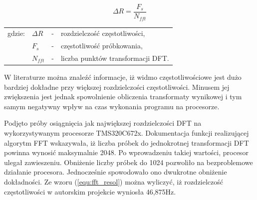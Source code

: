 \begin{equation} \label{equ:fft_resol}
\Delta R = \frac{F_{s}}{N_{fft}}
\end{equation}
\begin{tabular}{ l l l l}
	gdzie: 	&	$\Delta R$ & - &  rozdzielczość częstotliwości, \\
	&	$F_{s}$ & - &  częstotliwość próbkowania, \\
	&   $N_{fft}$ &  - & liczba punktów transformacji DFT. \\
\end{tabular}

W literaturze można znaleźć informacje, iż widmo częstotliwościowe jest dużo bardziej dokładne przy większej rozdzielczości częstotliwości. Minusem jej zwiększenia jest jednak spowolnienie obliczenia transformaty wynikowej i tym samym negatywny wpływ na czas wykonania programu na procesorze.

Podjęto próby osiągnięcia jak największej rozdzielczości DFT na wykorzystywanym procesorze TMS320C672x. Dokumentacja funkcji realizującej algorytm FFT wskazywała, iż liczba próbek do jednokrotnej transformacji DFT powinna wynosić maksymalnie 2048. Po wprowadzeniu takiej wartości, procesor ulegał zawieszeniu. Obniżenie liczby próbek do 1024 pozwoliło na bezproblemowe działanie procesora. Jednocześnie spowodowało ono dwukrotne obniżenie dokładności. Ze wzoru (\ref{equ:fft_resol}) można wyliczyć, iż rozdzielczość częstotliwości w autorskim projekcie wyniosła 46,875Hz.


